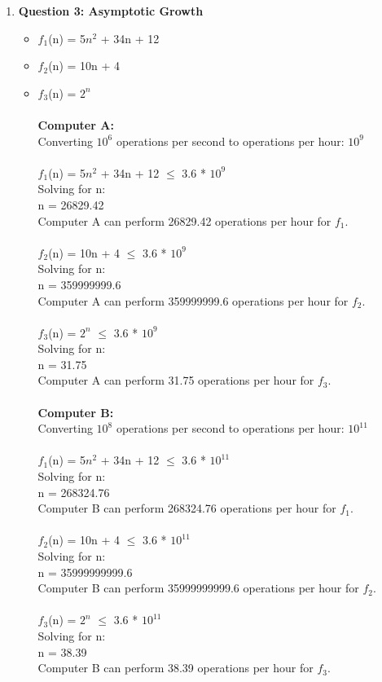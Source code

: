 \documentclass[11pt]{article}
\begin{document}
\begin{enumerate}
\item
\textbf{Question 3: Asymptotic Growth} %
\begin{itemize}
\item %
$f_{1}$(n) = 5$n^{2}$ + 34n + 12
\item
$f_{2}$(n) = 10n + 4
\item 
$f_{3}$(n) = $2^{n}$
\\ \\
\textbf{Computer A: } \\
Converting $10^{6}$ operations per second to operations per hour: $10^{9}$ \\
\\
$f_{1}$(n) = 5$n^{2}$ + 34n + 12 $\leq$ 3.6 * $10^{9}$ \\
Solving for n: \\
n = 26829.42 \\
Computer A can perform 26829.42 operations per hour for $f_{1}$. \\
\\
$f_{2}$(n) = 10n + 4 $\leq$ 3.6 * $10^{9}$ \\
Solving for n: \\
n = 359999999.6 \\
Computer A can perform 359999999.6 operations per hour for $f_{2}$. \\
\\
$f_{3}$(n) = $2^{n}$ $\leq$ 3.6 * $10^{9}$ \\
Solving for n: \\
n = 31.75 \\
Computer A can perform 31.75 operations per hour for $f_{3}$. \\
\\
\textbf{Computer B: } \\
Converting $10^{8}$ operations per second to operations per hour: $10^{11}$ \\
\\
$f_{1}$(n) = 5$n^{2}$ + 34n + 12 $\leq$ 3.6 * $10^{11}$ \\
Solving for n: \\
n = 268324.76 \\
Computer B can perform 268324.76 operations per hour for $f_{1}$. \\
\\
$f_{2}$(n) = 10n + 4 $\leq$ 3.6 * $10^{11}$ \\
Solving for n: \\
n = 35999999999.6 \\
Computer B can perform 35999999999.6 operations per hour for $f_{2}$. \\
\\
$f_{3}$(n) = $2^{n}$ $\leq$ 3.6 * $10^{11}$ \\
Solving for n: \\
n = 38.39 \\
Computer B can perform 38.39 operations per hour for $f_{3}$. \\
\\
\end{itemize}
\end{enumerate}
\end{document}

